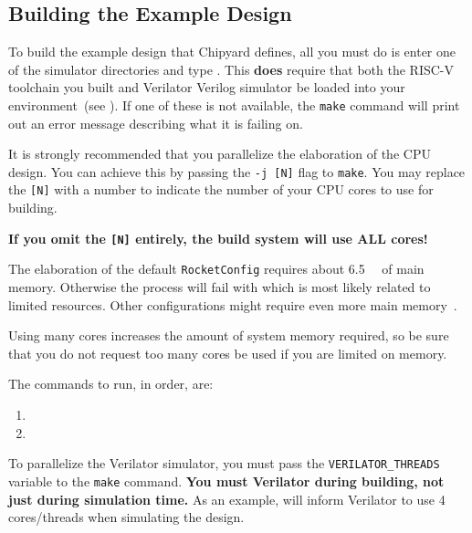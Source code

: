 \subsection{Building the Example Design}\label{sec:Building_Example_Design}
To build the example design that Chipyard defines, all you must do is enter one of the simulator directories and type .
This \textbf{does} require that both the RISC-V toolchain you built and Verilator Verilog simulator be loaded into your environment~(see ).
If one of these is not available, the \texttt{make} command will print out an error message describing what it is failing on.

\begin{blackbox}
  It is strongly recommended that you parallelize the \gls{elaboration} of the CPU design.
  You can achieve this by passing the \texttt{-j [N]} flag to \texttt{make}.
  You may replace the \texttt{[N]} with a number to indicate the number of your CPU cores to use for building.

  \textbf{If you omit the \texttt{[N]} entirely, the build system will use ALL cores!}

  The \gls{elaboration} of the default \texttt{RocketConfig} requires about \SI{6.5}{\giga\byte} of main memory.
  Otherwise the process will fail with  which is most likely related to limited resources.
  Other configurations might require even more main memory~\cite{chipyard}.

  Using many cores increases the amount of system memory required, so be sure that you do not request too many cores be used if you are limited on memory.
\end{blackbox}

The commands to run, in order, are:
\begin{enumerate}
\item {}
\item {}
\end{enumerate}

\begin{blackbox}
  To parallelize the Verilator simulator, you must pass the \texttt{VERILATOR\_THREADS} variable to the \texttt{make} command.
  \textbf{You must  Verilator during building, not just during simulation time.}
  As an example,  will inform Verilator to use 4 cores/threads when simulating the design.
\end{blackbox}

